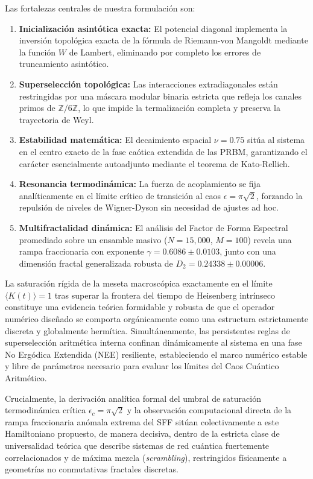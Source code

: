 \documentclass[aps,prl,preprint,superscriptaddress,floatfix]{revtex4-2}
\newcommand{\Zmod}{\mathbb{Z}/6\mathbb{Z}}
\begin{document}
Las fortalezas centrales de nuestra formulación son:
\begin{enumerate}
    \item \textbf{Inicialización asintótica exacta:} El potencial diagonal implementa la inversión topológica exacta de la fórmula de Riemann-von Mangoldt mediante la función $W$ de Lambert, eliminando por completo los errores de truncamiento asintótico.
    \item \textbf{Superselección topológica:} Las interacciones extradiagonales están restringidas por una máscara modular binaria estricta que refleja los canales primos de $\Zmod$, lo que impide la termalización completa y preserva la trayectoria de Weyl.
    \item \textbf{Estabilidad matemática:} El decaimiento espacial $\nu = 0.75$ sitúa al sistema en el centro exacto de la fase caótica extendida de las PRBM, garantizando el carácter esencialmente autoadjunto mediante el teorema de Kato-Rellich.
    \item \textbf{Resonancia termodinámica:} La fuerza de acoplamiento se fija analíticamente en el límite crítico de transición al caos $\epsilon = \pi \sqrt{2}$, forzando la repulsión de niveles de Wigner-Dyson sin necesidad de ajustes ad hoc.
    \item \textbf{Multifractalidad dinámica:} El análisis del Factor de Forma Espectral promediado sobre un ensamble masivo ($N=15,000$, $M=100$) revela una rampa fraccionaria con exponente $\gamma = 0.6086 \pm 0.0103$, junto con una dimensión fractal generalizada robusta de $D_2 = 0.24338 \pm 0.00006$.
\end{enumerate}

La saturación rígida de la meseta macroscópica exactamente en el límite $\langle K(t) \rangle = 1$ tras superar la frontera del tiempo de Heisenberg intrínseco constituye una evidencia teórica formidable y robusta de que el operador numérico diseñado se comporta orgánicamente como una estructura estrictamente discreta y globalmente hermítica. Simultáneamente, las persistentes reglas de superselección aritmética interna confinan dinámicamente al sistema en una fase No Ergódica Extendida (NEE) resiliente, estableciendo el marco numérico estable y libre de parámetros necesario para evaluar los límites del Caos Cuántico Aritmético.

Crucialmente, la derivación analítica formal del umbral de saturación termodinámica crítica $\epsilon_c = \pi\sqrt{2}$ y la observación computacional directa de la rampa fraccionaria anómala extrema del SFF sitúan colectivamente a este Hamiltoniano propuesto, de manera decisiva, dentro de la estricta clase de universalidad teórica que describe sistemas de red cuántica fuertemente correlacionados y de máxima mezcla (\textit{scrambling}), restringidos físicamente a geometrías no conmutativas fractales discretas.
\end{document}
